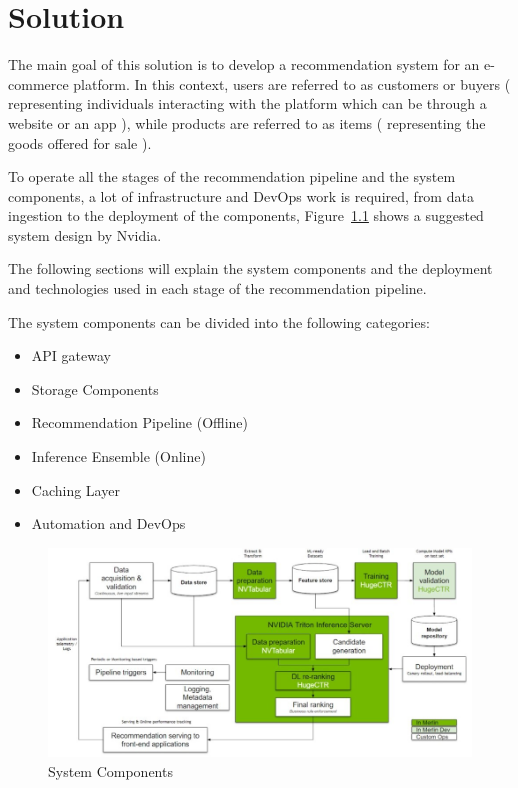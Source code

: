 \chapter{Solution}
\minitoc

The main goal of this solution is to develop a recommendation system for an e-commerce platform. 
In this context, users are referred to as customers or buyers ( representing individuals interacting with the platform which can be through a website or an app ), 
while products are referred to as items ( representing the goods offered for sale ).

To operate all the stages of the recommendation pipeline and the system components, 
a lot of infrastructure and DevOps work is required, from data ingestion to the deployment of the components, Figure~\ref{fig: SystemComponents} shows a suggested system design by Nvidia.

The following sections will explain the system components and the deployment and technologies used in each stage of the recommendation pipeline.

The system components can be divided into the following categories:
\begin{itemize}
    \item API gateway
    \item Storage Components
    \item Recommendation Pipeline (Offline)
    \item Inference Ensemble (Online)
    \item Caching Layer
    \item Automation and DevOps
\end{itemize}

\begin{figure}[H]
    \centering
    \includegraphics[width=\textwidth]{assets/components.jpeg}
    \caption[System Components]{System Components~\cite{NvidiaRecSysBestPractices}}
    \label{fig: SystemComponents}
\end{figure}

